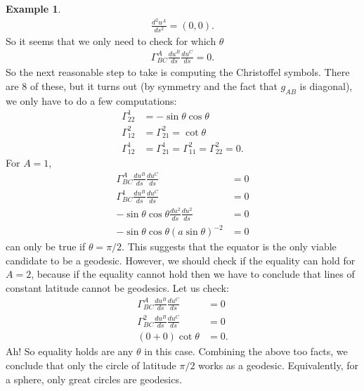 \documentclass{article}
\theoremstyle{definition}
\newtheorem{exmp}{Example}[section]
\begin{document}
\begin{exmp}
	\begin{align*}
	\frac{d^2u^A}{ds^2} = (0,0).
	\end{align*}
	So it seems that we only need to check for which $\theta$
	\begin{align*}
	\Gamma^{A}_{BC}\frac{du^B}{ds}\frac{du^C}{ds} = 0.
	\end{align*}
	So the next reasonable step to take is computing the Christoffel symbols. There are 8 of these, but it turns out (by symmetry and the fact that $g_{AB}$ is diagonal), we only have to do a few computations:
	\begin{align*}
	\Gamma^1_{22} &= -\sin\theta\cos\theta\\
	\Gamma^2_{12} &= \Gamma^2_{21} = \cot\theta\\
	\Gamma^1_{12} &= \Gamma^1_{21} = \Gamma^2_{11} = \Gamma^2_{22} = 0.
	\end{align*}
	For $A = 1$, 
	\begin{align*}
	\Gamma^{A}_{BC}\frac{du^B}{ds}\frac{du^C}{ds} &= 0\\
	\Gamma^{1}_{BC}\frac{du^B}{ds}\frac{du^C}{ds} &= 0\\
	-\sin\theta\cos\theta\frac{du^2}{ds}\frac{du^2}{ds} &= 0\\
	-\sin\theta\cos\theta\left(a\sin\theta \right)^{-2} &= 0
	\end{align*}
	can only be true if $\theta = \pi/2$. This suggests that the equator is the only viable candidate to be a geodesic. However, we should check if the equality can hold for $A=2$, because if the equality cannot hold then we have to conclude that lines of constant latitude cannot be geodesics. Let us check:
	\begin{align*}
	\Gamma^{A}_{BC}\frac{du^B}{ds}\frac{du^C}{ds} &= 0\\
	\Gamma^{2}_{BC}\frac{du^B}{ds}\frac{du^C}{ds} &= 0\\
	(0+0)\cot\theta &= 0.
	\end{align*}
	Ah! So equality holds are any $\theta$ in this case. Combining the above too facts, we conclude that only the circle of latitude $\pi/2$ works as a geodesic. Equivalently, for a sphere, only great circles are geodesics.
\end{exmp}
\end{document}
